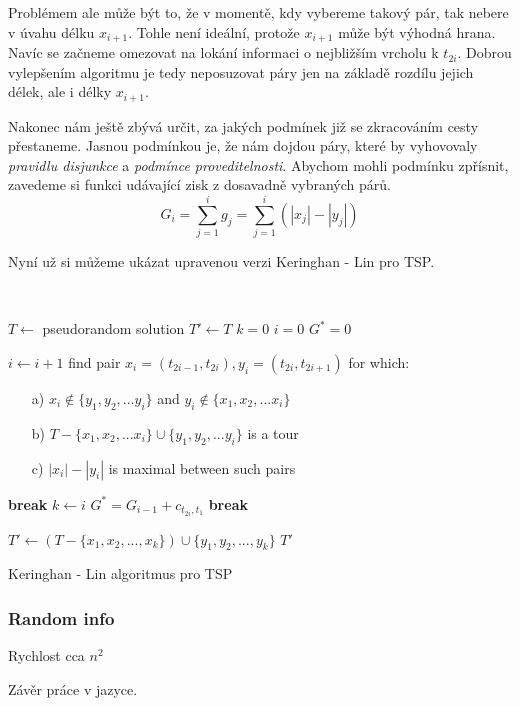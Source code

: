 \documentclass[
  biblatex,
  figures=false,
  glossaries,
  index
]{kidiplom}
\begin{document}
Problémem ale může být to, že v momentě, kdy vybereme takový pár, tak nebere v úvahu délku $x_{i+1}$. Tohle není ideální, protože $x_{i+1}$ může být výhodná hrana. Navíc se začneme omezovat na lokání informaci o nejbližším vrcholu k $t_{2i}$. Dobrou vylepšením algoritmu je tedy neposuzovat páry jen na základě rozdílu jejich délek, ale i délky $x_{i+1}$.

Nakonec nám ještě zbývá určit, za jakých podmínek již se zkracováním cesty přestaneme. Jasnou podmínkou je, že nám dojdou páry, které by vyhovovaly \textit{pravidlu disjunkce} a \textit{podmínce proveditelnosti}. Abychom mohli podmínku zpřísnit, zavedeme si funkci udávající zisk z dosavadně vybraných párů.
$$G_i = \sum_{j=1}^{i}g_j = \sum_{j=1}^{i}{(|x_j| - |y_j|)}$$

Nyní už si můžeme ukázat upravenou verzi Keringhan - Lin pro TSP.
\newline

{\LinesNumbered\SetAlgoNoLine\
\begin{algorithm}[H]
%
$T \leftarrow$ pseudorandom solution\;
$T' \leftarrow T$\;
$k = 0$\;
$i = 0$\;
$G^* = 0$ \;
{
$i \leftarrow i + 1$\;
find pair $x_{i} = (t_{2i-1}, t_{2i}), y_i = (t_{2i}, t_{2i+1})$ for which:
{\begin{itemize}
\item[a)] $x_{i} \notin \{y_1, y_2,... y_i\}$ and  $y_i \notin \{x_1, x_2,... x_i\}$ 
\item[b)] $T - \{x_1, x_2,... x_i\} \cup \{y_1, y_2,... y_i\}$ is a tour
\item[c)] $|x_{i}| - |y_i|$ is maximal between such pairs
\end{itemize}}
	{\textbf{break}\;}
	{$k \leftarrow i$\;
	 $G^* = G_{i-1} + c_{t_{2i},t_1}$\;}
	{\textbf{break}\;}
}
$T' \leftarrow (T - \{x_1, x_2, ..., x_k\}) \cup \{y_1, y_2, ..., y_k\}$\;
\Return $T'$\;
\caption{Keringhan - Lin algoritmus pro TSP}
\end{algorithm}}\leavevmode\newline



\subsubsection{Random info}
Rychlost cca $n ^ 2$

\begin{kiconclusions}
Závěr práce v  jazyce.
\end{kiconclusions}
\end{document}
